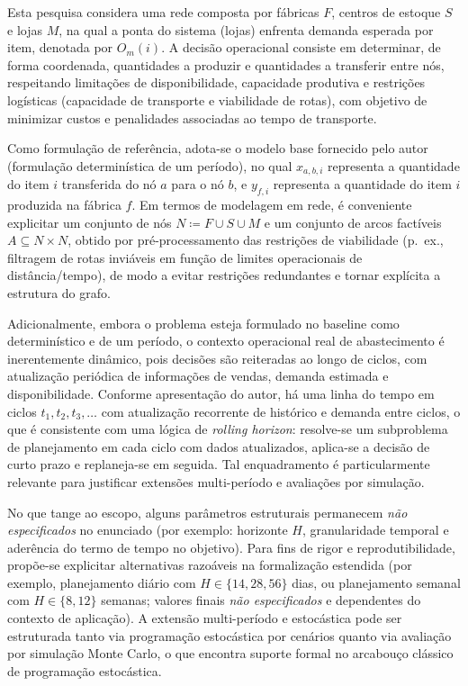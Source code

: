 Esta pesquisa considera uma rede composta por fábricas \(F\), centros de estoque \(S\) e lojas \(M\), na qual a ponta do sistema (lojas) enfrenta demanda esperada por item, denotada por \(O_m(i)\). A decisão operacional consiste em determinar, de forma coordenada, quantidades a produzir e quantidades a transferir entre nós, respeitando limitações de disponibilidade, capacidade produtiva e restrições logísticas (capacidade de transporte e viabilidade de rotas), com objetivo de minimizar custos e penalidades associadas ao tempo de transporte.

Como formulação de referência, adota-se o modelo base fornecido pelo autor (formulação determinística de um período), no qual \(x_{a,b,i}\) representa a quantidade do item \(i\) transferida do nó \(a\) para o nó \(b\), e \(y_{f,i}\) representa a quantidade do item \(i\) produzida na fábrica \(f\). Em termos de modelagem em rede, é conveniente explicitar um conjunto de nós \(N \coloneqq F \cup S \cup M\) e um conjunto de arcos factíveis \(A \subseteq N \times N\), obtido por pré-processamento das restrições de viabilidade (p.\ ex., filtragem de rotas inviáveis em função de limites operacionais de distância/tempo), de modo a evitar restrições redundantes e tornar explícita a estrutura do grafo. \cite{AhujaMagnantiOrlin1993NetworkFlows,Shapiro2001ModelingSupplyChain}

Adicionalmente, embora o problema esteja formulado no baseline como determinístico e de um período, o contexto operacional real de abastecimento é inerentemente dinâmico, pois decisões são reiteradas ao longo de ciclos, com atualização periódica de informações de vendas, demanda estimada e disponibilidade. Conforme apresentação do autor, há uma linha do tempo em ciclos \(t_1,t_2,t_3,\dots\) com atualização recorrente de histórico e demanda entre ciclos, o que é consistente com uma lógica de \emph{rolling horizon}: resolve-se um subproblema de planejamento em cada ciclo com dados atualizados, aplica-se a decisão de curto prazo e replaneja-se em seguida. Tal enquadramento é particularmente relevante para justificar extensões multi-período e avaliações por simulação. \cite{Law2015SimulationModeling}

No que tange ao escopo, alguns parâmetros estruturais permanecem \emph{não especificados} no enunciado (por exemplo: horizonte \(H\), granularidade temporal e aderência do termo de tempo no objetivo). Para fins de rigor e reprodutibilidade, propõe-se explicitar alternativas razoáveis na formalização estendida (por exemplo, planejamento diário com \(H \in \{14,28,56\}\) dias, ou planejamento semanal com \(H \in \{8,12\}\) semanas; valores finais \emph{não especificados} e dependentes do contexto de aplicação). A extensão multi-período e estocástica pode ser estruturada tanto via programação estocástica por cenários quanto via avaliação por simulação Monte Carlo, o que encontra suporte formal no arcabouço clássico de programação estocástica. \cite{BirgeLouveaux2011StochasticProgramming,Law2015SimulationModeling}

